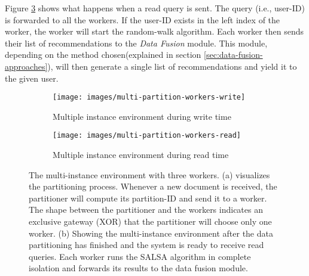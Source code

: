 Figure \ref{fig:multiple-machine-architecture-read} shows what happens when a read query is sent. The query (i.e., user-ID) is forwarded to all the workers. If the user-ID exists in the left index of the worker, the worker will start the random-walk algorithm. Each worker then sends their list of recommendations to the \emph{Data Fusion} module. This module, depending on the method chosen(explained in section \ref{sec:data-fusion-approaches}), will then generate a single list of recommendations and yield it to the given user.



\begin{figure}[!htb]
    \centering
    \begin{subfigure}[b]{0.75\textwidth}
        \centering
        \texttt{[image: images/multi-partition-workers-write]}
        \caption{Multiple instance environment during write time}
        \label{fig:multiple-machine-architecture-write}
    \end{subfigure}
    
    \begin{subfigure}[b]{1\textwidth}
        \centering
        \texttt{[image: images/multi-partition-workers-read]}
        \caption{Multiple instance environment during read time}
        \label{fig:multiple-machine-architecture-read}
    \end{subfigure}
    
    \caption {The multi-instance environment with three workers. (a) visualizes the partitioning process. Whenever a new document is received, the partitioner will compute its partition-ID and send it to a worker. The shape between the partitioner and the workers indicates an exclusive gateway (XOR) that the partitioner will choose only one worker. (b) Showing the multi-instance environment after the data partitioning has finished and the system is ready to receive read queries. Each worker runs the SALSA algorithm in complete isolation and forwards its results to the data fusion module.}
\end{figure}
